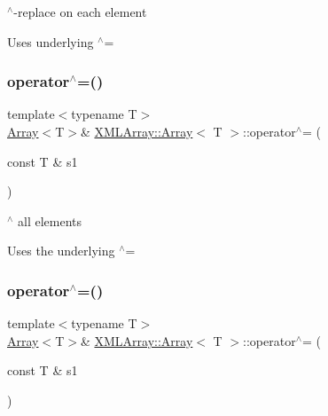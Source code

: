 $^\wedge$-\/replace on each element 

Uses underlying $^\wedge$= \mbox{\label{classXMLArray_1_1Array_ac68e4b59911e762c271c90a6aa81e0c3}} 
\subsubsection{\texorpdfstring{operator$^\wedge$=()}{operator^=()}\hspace{0.1cm}{\footnotesize\ttfamily [4/6]}}
{\footnotesize\ttfamily template$<$typename T$>$ \\
\mbox{\hyperlink{classXMLArray_1_1Array}{Array}}$<$T$>$\& \mbox{\hyperlink{classXMLArray_1_1Array}{X\+M\+L\+Array\+::\+Array}}$<$ T $>$\+::operator$^\wedge$= (\begin{DoxyParamCaption}\item[{const T \&}]{s1 }\end{DoxyParamCaption})\hspace{0.3cm}{\ttfamily [inline]}}



$^\wedge$ all elements 

Uses the underlying $^\wedge$= \mbox{\label{classXMLArray_1_1Array_ac68e4b59911e762c271c90a6aa81e0c3}} 
\subsubsection{\texorpdfstring{operator$^\wedge$=()}{operator^=()}\hspace{0.1cm}{\footnotesize\ttfamily [5/6]}}
{\footnotesize\ttfamily template$<$typename T$>$ \\
\mbox{\hyperlink{classXMLArray_1_1Array}{Array}}$<$T$>$\& \mbox{\hyperlink{classXMLArray_1_1Array}{X\+M\+L\+Array\+::\+Array}}$<$ T $>$\+::operator$^\wedge$= (\begin{DoxyParamCaption}\item[{const T \&}]{s1 }\end{DoxyParamCaption})\hspace{0.3cm}{\ttfamily [inline]}}




